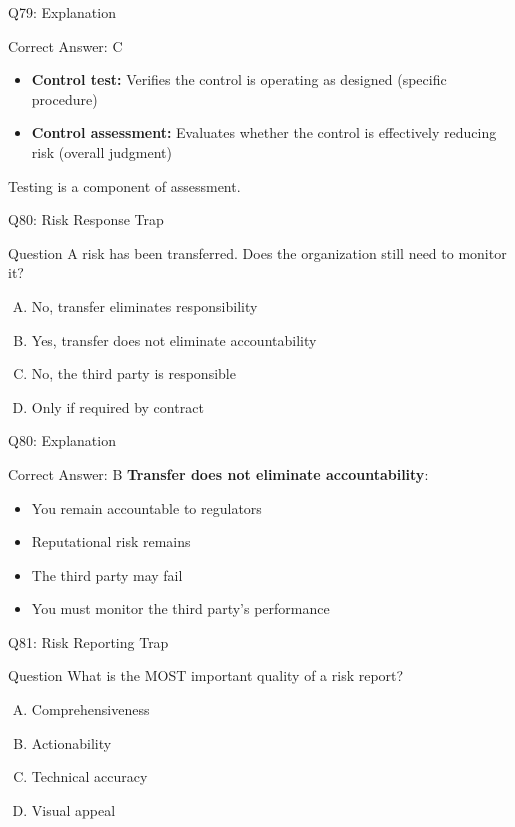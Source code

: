 \documentclass{beamer}
\begin{document}
	\begin{frame}{Q79: Explanation}
		\begin{block}{Correct Answer: C}
			\begin{itemize}
				\item \textbf{Control test:} Verifies the control is operating as designed (specific procedure)
				\item \textbf{Control assessment:} Evaluates whether the control is effectively reducing risk (overall judgment)
			\end{itemize}
			Testing is a component of assessment.
		\end{block}
	\end{frame}
	
	\begin{frame}{Q80: Risk Response Trap}
		\begin{block}{Question}
			A risk has been transferred. Does the organization still need to monitor it?
		\end{block}
		\begin{enumerate}[(A)]
			\item No, transfer eliminates responsibility
			\item Yes, transfer does not eliminate accountability
			\item No, the third party is responsible
			\item Only if required by contract
		\end{enumerate}
	\end{frame}
	
	\begin{frame}{Q80: Explanation}
		\begin{block}{Correct Answer: B}
			\textbf{Transfer does not eliminate accountability}:
			\begin{itemize}
				\item You remain accountable to regulators
				\item Reputational risk remains
				\item The third party may fail
				\item You must monitor the third party's performance
			\end{itemize}
		\end{block}
	\end{frame}
	
	\begin{frame}{Q81: Risk Reporting Trap}
		\begin{block}{Question}
			What is the MOST important quality of a risk report?
		\end{block}
		\begin{enumerate}[(A)]
			\item Comprehensiveness
			\item Actionability
			\item Technical accuracy
			\item Visual appeal
		\end{enumerate}
	\end{frame}
	
\end{document}
